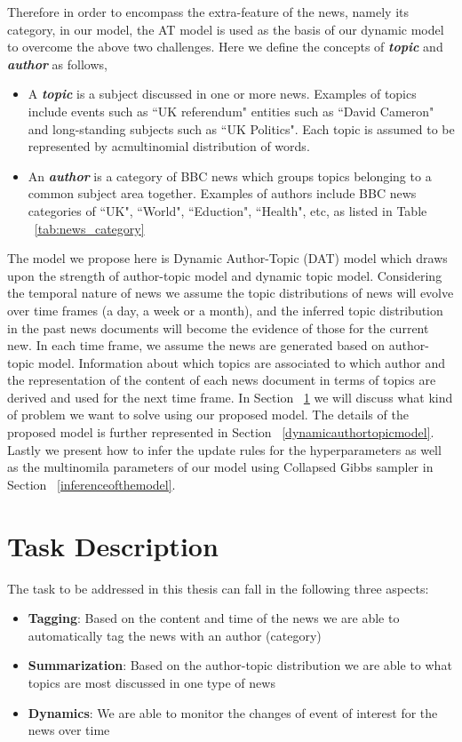 Therefore in order to encompass the extra-feature of the news, namely its category, in our model, the AT model is used as the basis of our dynamic model to overcome the above two challenges. Here we define the concepts of \textbf{\textit{topic}} and \textbf{\textit{author}} as follows,
\begin{itemize}
  \item A \textbf{\textit{topic}} is a subject discussed in one or more news. Examples of topics include events such as ``UK referendum" entities such as ``David Cameron" and long-standing subjects such as ``UK Politics". Each topic is assumed to be represented by acmultinomial distribution of words.
  \item An \textbf{\textit{author}} is a category of BBC news which groups topics belonging to a common subject
  area together. Examples of authors include BBC news categories of ``UK", ``World", ``Eduction", ``Health", etc, as listed in Table ~\ref{tab:news_category}
  \end{itemize}
The model we propose here is Dynamic Author-Topic (DAT) model which draws upon the strength of author-topic model and dynamic topic model. Considering the temporal nature of news we assume the topic distributions of news will evolve over time frames (a day, a week or a month), and the inferred topic distribution in the past news documents will become the evidence of those for the current new. In each time frame, we assume the news are generated based on author-topic model. Information about which topics are associated to which author and the representation of the content of each news document in terms of topics are derived and used for the next time frame. In Section ~\ref{taskdescription} we will discuss what kind of problem we want to solve using our proposed model. The details of the proposed model is further represented in Section ~\ref{dynamicauthortopicmodel}. Lastly we present how to infer the update rules for the hyperparameters as well as the multinomila parameters of our model using Collapsed Gibbs sampler in Section ~\ref{inferenceofthemodel}.

\section{Task Description}
\label{taskdescription}
The task to be addressed in this thesis can fall in the following three aspects:

\begin{itemize}
  \item \textbf{Tagging}: Based on the content and time of the news we are able to automatically tag the news with an author (category)
  \item \textbf{Summarization}: Based on the author-topic distribution we are able to what topics are most discussed in one type of news
  \item \textbf{Dynamics}: We are able to monitor the changes of event of interest for the news over time
\end{itemize}


